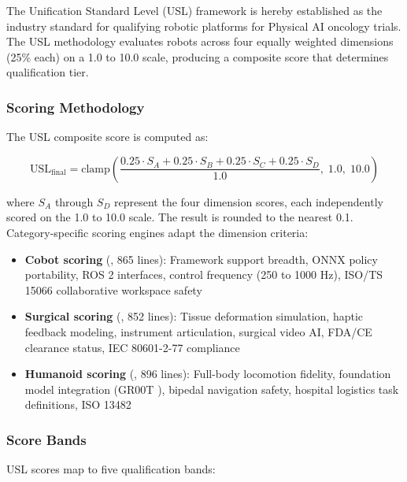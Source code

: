 \documentclass[11pt,letterpaper]{article}
\begin{document}
The Unification Standard Level (USL) framework \cite{kawchak2026usl} is hereby established as the industry standard for qualifying robotic platforms for Physical AI oncology trials. The USL methodology evaluates robots across four equally weighted dimensions (25\% each) on a 1.0 to 10.0 scale, producing a composite score that determines qualification tier.

\subsubsection{Scoring Methodology}

The USL composite score is computed as:

\begin{equation}
\text{USL}_{\text{final}} = \text{clamp}\!\left(\frac{0.25 \cdot S_A + 0.25 \cdot S_B + 0.25 \cdot S_C + 0.25 \cdot S_D}{1.0},\; 1.0,\; 10.0\right)
\end{equation}

where $S_A$ through $S_D$ represent the four dimension scores, each independently scored on the 1.0 to 10.0 scale. The result is rounded to the nearest 0.1. Category-specific scoring engines adapt the dimension criteria:

\begin{itemize}
  \item \textbf{Cobot scoring} (, 865 lines): Framework support breadth, ONNX policy portability, ROS 2 interfaces, control frequency (250 to 1000 Hz), ISO/TS 15066 collaborative workspace safety
  \item \textbf{Surgical scoring} (, 852 lines): Tissue deformation simulation, haptic feedback modeling, instrument articulation, surgical video AI, FDA/CE clearance status, IEC 80601-2-77 compliance \cite{iec80601}
  \item \textbf{Humanoid scoring} (, 896 lines): Full-body locomotion fidelity, foundation model integration (GR00T \cite{groot2026}), bipedal navigation safety, hospital logistics task definitions, ISO 13482 \cite{iso13482}
\end{itemize}

\subsubsection{Score Bands}

USL scores map to five qualification bands:
\end{document}
